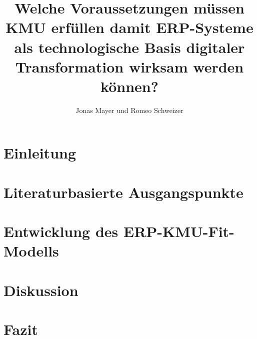 \documentclass[german, oneside]{htwg-report}
\begin{document}

\frontmatter



\title[Welche Voraussetzungen müssen KMU erfüllen damit ERP-Systeme als technologische Basis digitaler Transformation wirksam werden können?]{Welche Voraussetzungen müssen KMU erfüllen damit ERP-Systeme als technologische Basis digitaler Transformation wirksam werden können?}

\author{Jonas Mayer und Romeo Schweizer}



%          






\tableofcontents

\mainmatter

\chapter{Einleitung}



\chapter{Literaturbasierte Ausgangspunkte}
\label{sec:ausgangspunkte}



\chapter{Entwicklung des ERP-KMU-Fit-Modells}
\label{sec:modell}



\chapter{Diskussion}
\label{sec:diskussion}



\chapter{Fazit}
\label{sec:fazit}



\appendix

%

\printbibliography[heading=bibintoc]
\end{document}

